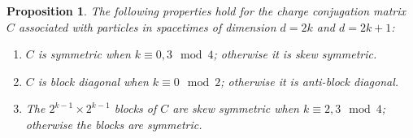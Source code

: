 \documentclass[english]{ourlematema}
\numberwithin{theorem}{section}
\newtheorem{proposition}[theorem]{Proposition}
\theoremstyle{definition}
\begin{document}
\begin{proposition} \label{prop:Cproperties}
    The following properties hold for the charge conjugation matrix $C$ associated with particles
    in spacetimes of dimension $d=2k$ and $d=2k+1$:
    \begin{enumerate}
        \item  $C$ is symmetric when $k \equiv 0,3 \!\! \mod{4}$; otherwise it is skew symmetric.
        \item $C$ is block diagonal when $k \equiv 0 \!\!\! \mod{2}$; otherwise it is anti-block diagonal.
        \item The $2^{k - 1} \times 2^{k - 1}$ blocks of $C$ are skew symmetric when $k \equiv 2,3 \!\! \mod{4}$; otherwise the blocks are symmetric.
    \end{enumerate}  
\end{proposition}
\end{document}
